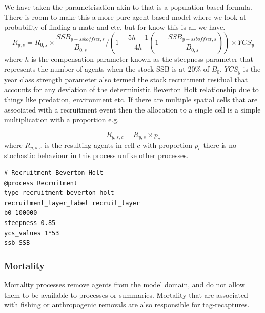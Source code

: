 We have taken the parametrisation akin to \cite{mace_doonan_88} that is a population based formula. There is room to make this a more pure agent based model where we look at probability of finding a mate and etc, but for know this is all we have.
\begin{equation}
R_{y,s} = R_{0,s} \times \frac{SSB_{y-ssb offset,s}}{B_{0,s}}/ \left(1 - \frac{5h - 1}{4h} \left( 1 - \frac{SSB_{y-ssb offset,s}}{B_{0,s}}\right)\right) \times YCS_y
\end{equation}
where $h$ is the compensation parameter known as the steepness parameter that represents the number of agents when the stock SSB is at 20\% of $B_0$, $YCS_y$ is the year class strength parameter also termed the stock recruitment residual that accounts for any deviation of the deterministic Beverton Holt relationship due to things like predation, environment etc. If there are multiple spatial cells that are associated with a recruitment event then the allocation to a single cell is a simple multiplication with a proportion e.g.

\begin{equation}
R_{y,s,c} = R_{y,s} \times p_c
\end{equation}
where $R_{y,s,c}$ is the resulting agents in cell $c$ with proportion $p_c$ there is no stochastic behaviour in this process unlike other processes.

{\small{\begin{verbatim}
# Recruitment Beverton Holt
@process Recruitment
type recruitment_beverton_holt
recruitment_layer_label recruit_layer
b0 100000
steepness 0.85
ycs_values 1*53
ssb SSB
\end{verbatim}}}

\subsubsection{Mortality}\label{sec:mortality}
Mortality processes remove agents from the model domain, and do not allow them to be available to processes or summaries. Mortality that are associated with fishing or anthropogenic removals are also responsible for tag-recaptures.\\

